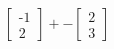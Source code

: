 \documentclass[preview]{standalone}
\begin{document}
\begin{align*}
\begin{bmatrix} \text{-}1 \\ 2 \end{bmatrix} + - \begin{bmatrix} 2 \\ 3 \end{bmatrix}
\end{align*}
\end{document}
